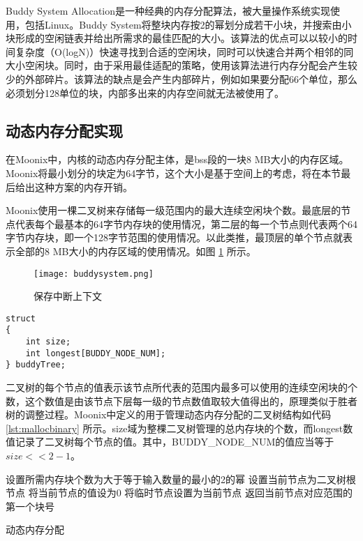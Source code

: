 Buddy System Allocation是一种经典的内存分配算法\cite{DBLP:journals/acta/BrodalDM05}，被大量操作系统实现使用，包括Linux。Buddy System将整块内存按2的幂划分成若干小块，并搜索由小块形成的空闲链表并给出所需求的最佳匹配的大小。该算法的优点可以以较小的时间复杂度（O(logN)）快速寻找到合适的空闲块，同时可以快速合并两个相邻的同大小空闲块。同时，由于采用最佳适配的策略，使用该算法进行内存分配会产生较少的外部碎片。该算法的缺点是会产生内部碎片，例如如果要分配66个单位，那么必须划分128单位的块，内部多出来的内存空间就无法被使用了。

\subsection{动态内存分配实现}

在Moonix中，内核的动态内存分配主体，是bss段的一块8 MB大小的内存区域。Moonix将最小划分的块定为64字节，这个大小是基于空间上的考虑，将在本节最后给出这种方案的内存开销。

Moonix使用一棵二叉树来存储每一级范围内的最大连续空闲块个数。最底层的节点代表每个最基本的64字节内存块的使用情况，第二层的每一个节点则代表两个64字节内存块，即一个128字节范围的使用情况。以此类推，最顶层的单个节点就表示全部的8 MB大小的内存区域的使用情况。如图 \ref{pic:buddysystem} 所示。

\begin{figure}[htpb]
	\centering
	\texttt{[image: buddysystem.png]}
	\setlength{\abovecaptionskip}{2pt}
	\caption{保存中断上下文}
	\label{pic:buddysystem}
\end{figure}


\begin{minipage}[c]{0.95\textwidth}
\begin{lstlisting}[language={moonix}, caption={动态内存分配管理二叉树}, label={lst:mallocbinary}]
struct
{
	int size;
	int longest[BUDDY_NODE_NUM];
} buddyTree;
\end{lstlisting}
\end{minipage}

二叉树的每个节点的值表示该节点所代表的范围内最多可以使用的连续空闲块的个数，这个数值是由该节点下层每一级的节点数值取较大值得出的，原理类似于胜者树的调整过程。Moonix中定义的用于管理动态内存分配的二叉树结构如代码 \ref{lst:mallocbinary} 所示。size域为整棵二叉树管理的总内存块的个数，而longest数值记录了二叉树每个节点的值。其中，BUDDY\_NODE\_NUM的值应当等于$size<<2-1$。\\

\begin{algorithm}[H]
	
	设置所需内存块个数为大于等于输入数量的最小的2的幂\;
	设置当前节点为二叉树根节点\;
	将当前节点的值设为0\;
	将临时节点设置为当前节点\;
	返回当前节点对应范围的第一个块号\;
	\caption{动态内存分配}
	\label{alg:kalloc}
\end{algorithm}

